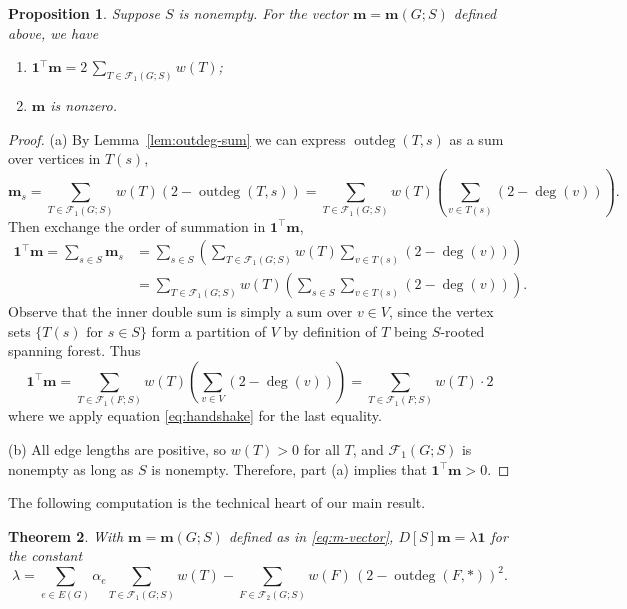 \documentclass[12pt]{amsart}
\newtheorem{thm}{Theorem}[section]
\newtheorem{prop}[thm]{Proposition}
\theoremstyle{definition}
\newcommand{\bone}{\mathbf{1}}
\newcommand{\boldm}{\mathbf{m}}
\newcommand{\tr}{\intercal}
\newcommand{\trees}{\mathcal{F}_1}
\newcommand{\forests}{\mathcal{F}}
\DeclareMathOperator{\outdeg}{outdeg}
\begin{document}
\begin{prop}
\label{prop:m-sum}
Suppose $S$ is nonempty.
For the vector $\boldm = \boldm(G; S)$ defined above, we have
\begin{enumerate}[label=(\alph*)]
\item
$\displaystyle \bone^\tr \boldm = 2 \,\sum_{T \in \trees(G;S)} w({T})$;

\item 
$\boldm$ is nonzero.
\end{enumerate}
\end{prop}
\begin{proof}
(a)
By Lemma~\ref{lem:outdeg-sum} we can express $\outdeg(T, s)$ as a sum over vertices in $T(s)$,
\[
	\boldm_s = \sum_{T \in \trees(G;S)} w({T}) (2 - \outdeg (T,s))
= \sum_{T \in \trees(G;S)} w({T}) \left( \sum_{v \in T(s)}(2 - \deg(v))\right).
\]
Then exchange the order of summation in $\bone^\tr \boldm$,
\begin{align}
	\bone^\tr \boldm = \sum_{s\in S} \boldm_s &= \sum_{s \in S} \left( \sum_{T \in \trees(G;S)} w({T}) \sum_{v \in T(s)}(2 - \deg(v)) \right) \\
	&= \sum_{T \in \trees(G;S)} w({T}) \left( \sum_{s\in S} \sum_{v \in T(s)} (2 - \deg(v)) \right) .
\end{align}
Observe that the inner double sum is simply a sum over $v \in V$,
since the vertex sets $\{T(s) \text{ for } s \in S\}$ form a partition of $V$ by definition of $T$ being $S$-rooted spanning forest.
Thus 
\[
	\bone^\tr \boldm = \sum_{T \in \trees(F;S)} w({T}) \left( \sum_{v \in V} (2 - \deg(v))\right)
	= \sum_{T \in \trees(F;S)} w({T}) \cdot 2 
\]
where we apply equation \eqref{eq:handshake} for the last equality.

(b) 
All edge lengths are positive, so $w({T}) > 0$ for all $T$, and $\trees(G; S)$ is nonempty as long as $S$ is nonempty. 
Therefore, part (a) implies that $\bone^\tr \boldm > 0$.
\end{proof}


The following computation is the technical heart of our main result.

\begin{thm}
\label{thm:m-distance-product}
With $\boldm = \boldm(G;S)$ defined as in \eqref{eq:m-vector},
$D[S] \boldm = \lambda \bone$
for the constant
\begin{equation}
\label{eq:lambda}
	\lambda = \sum_{e \in E(G)} \alpha_e \sum_{T\in \trees(G;S)} w({T}) - \sum_{F \in \forests_2(G;S)} w({F}) \, (2 - \outdeg(F,*))^2.
\end{equation}
\end{thm}
\end{document}
